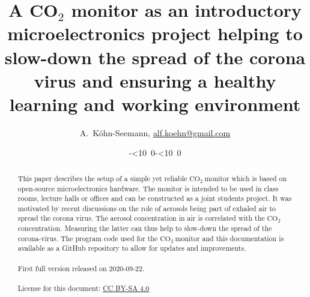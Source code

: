 \documentclass[12pt,a4paper]{article}
\def\myisodate{\leavevmode\hbox{\the\year-\twodigits\month-\twodigits\day}}
\def\twodigits#1{\ifnum#1<10 0\fi\the#1}
\newcommand{\coo}{\ensuremath{\mathrm{CO_2}~}}
\begin{document}
\title{A CO$_2$ monitor as an introductory microelectronics project helping to slow-down the spread of the corona virus and ensuring a healthy learning and working environment}

\author{A.~K\"{o}hn-Seemann, \href{mailto:alf.koehn@gmail.com}{alf.koehn@gmail.com}}
		
\date{\myisodate}

\maketitle

\begin{abstract}
This paper describes the setup of a simple yet reliable \coo monitor which is based on open-source microelectronics hardware. The monitor is intended to be used in class rooms, lecture halls or offices and can be constructed as a joint students project. It was motivated by recent discussions on the role of aerosols being part of exhaled air to spread the corona virus. The aerosol concentration in air is correlated with the \coo concentration. Measuring the latter can thus help to slow-down the spread of the corona-virus. The program code used for the \coo monitor and this documentation is available as a GitHub repository to allow for updates and improvements. 
\\ \quad \\ First full version released on 2020-09-22.
\\ \quad \\ License for this document: \href{https://creativecommons.org/licenses/by-sa/4.0/}{CC BY-SA 4.0}
\end{abstract}




\end{document}
